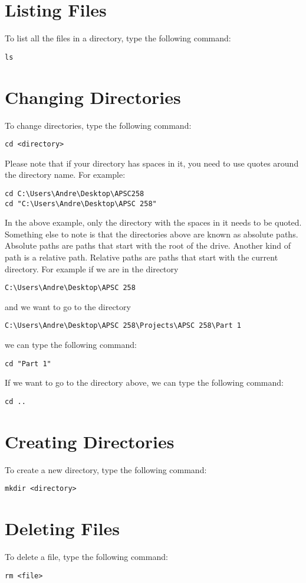 \documentclass[11pt]{report}
\begin{document}
\section{Listing Files}
To list all the files in a directory, type the following command:
\begin{verbatim}
ls
\end{verbatim}
\section{Changing Directories}
To change directories, type the following command:
\begin{verbatim}
cd <directory>
\end{verbatim}
Please note that if your directory has spaces in it, you need to use quotes around the directory name. For example:
\begin{verbatim}
cd C:\Users\Andre\Desktop\APSC258
cd "C:\Users\Andre\Desktop\APSC 258"
\end{verbatim}    
In the above example, only the directory with the spaces in it needs to be quoted.
Something else to note is that the directories above are known as absolute paths. Absolute paths are paths that start with the root of the drive. Another kind of path is a relative path. Relative paths are paths that start with the current directory. For example if we are in the directory 
\begin{verbatim}
C:\Users\Andre\Desktop\APSC 258
\end{verbatim}
and we want to go to the directory
\begin{verbatim}
C:\Users\Andre\Desktop\APSC 258\Projects\APSC 258\Part 1    
\end{verbatim}
we can type the following command:
\begin{verbatim}
cd "Part 1"
\end{verbatim}
If we want to go to the directory above, we can type the following command:
\begin{verbatim}
cd ..
\end{verbatim}
\section{Creating Directories}
To create a new directory, type the following command:
\begin{verbatim}
mkdir <directory>
\end{verbatim}
\section{Deleting Files}
To delete a file, type the following command:
\begin{verbatim}
rm <file>
\end{verbatim}
\end{document}
